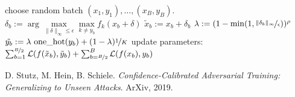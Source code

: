 \documentclass[12pt,a4paper]{article}
\begin{document}
	\begin{algorithmic}[1]
		\STATE choose random batch $(x_1,y_1),\ldots,(x_B,y_B)$.
		\STATE $\delta_b:=\arg\max\limits_{\|\delta\|_\infty \leq \epsilon} \max\limits_{k \neq y_b} f_k(x_b{+}\delta)$
		\STATE $\tilde{x}_b := x_b + \delta_b$
		\STATE $\lambda := (1 - \min(1, \nicefrac{\|\delta_b\|_\infty}{\epsilon}))^\rho$
		\STATE $\tilde{y_b} := \lambda \,\,\text{one\_hot}(y_b) + (1 - \lambda) \nicefrac{1}{K}$
		\ENDFOR
		\STATE update parameters:\\\hspace*{1cm}$\sum_{b = 1}^{\nicefrac{B}{2}} \mathcal{L}(f(\tilde{x}_b), \tilde{y}_b) + \sum_{b = \nicefrac{B}{2}}^{B} \mathcal{L}(f(x_b), y_b)$
		\ENDWHILE
	\end{algorithmic}

	\begin{thebibliography}{1}
		D. Stutz, M. Hein, B. Schiele.
		\emph{Confidence-Calibrated Adversarial Training: Generalizing to Unseen Attacks}.
		ArXiv, 2019.
	\end{thebibliography}
\end{document}

